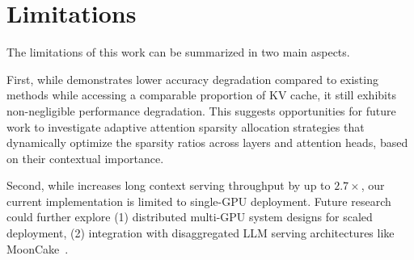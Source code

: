 \section{Limitations}

The limitations of this work can be summarized in two main aspects.

First, while {\name} demonstrates lower accuracy degradation compared to existing methods while accessing a comparable proportion of KV cache,
it still exhibits non-negligible performance degradation.
This suggests opportunities for future work to investigate adaptive attention sparsity allocation strategies that dynamically optimize the sparsity ratios across layers and attention heads, based on their contextual importance.

Second, while {\name} increases long context serving throughput by up to \(2.7 \times\), our current implementation is limited to single-GPU deployment.
Future research could further explore (1) distributed multi-GPU system designs for scaled deployment, (2) integration with disaggregated LLM serving architectures like MoonCake~\citep{mooncake}.